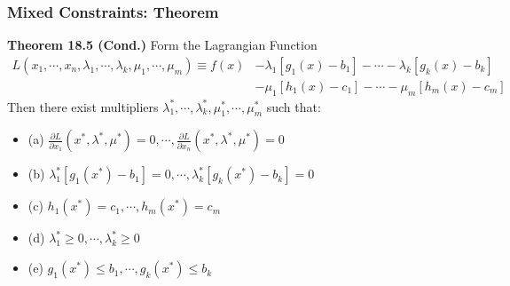 \documentclass[9pt,aspectratio=169]{beamer}
\begin{document}
\begin{frame}
	\frametitle{Mixed Constraints: Theorem}
    \begin{block}{\textbf{Theorem 18.5 (Cond.)}}
        Form the Lagrangian Function \small
        \begin{align} 
            L(x_1,\cdots,x_n,\lambda_1,\cdots,\lambda_k,\mu_1,\cdots,\mu_m)
            \equiv f(x)&-\lambda_1[g_1(x)-b_1]-\cdots - \lambda_k[g_k(x)-b_k] \nonumber \\
            & -\mu_1[h_1(x)-c_1]-\cdots - \mu_m[h_m(x)-c_m]
            \nonumber
        \end{align} 
        Then there exist multipliers $\lambda_1^*,\cdots,
        \lambda_k^*,\mu_1^*,\cdots,\mu_m^*$ such that:
        \begin{itemize}
            \item (a) $\frac{\partial L}{\partial x_1}(x^*,\lambda^*,\mu^*) = 0,\cdots, \frac{\partial L}{\partial x_n}(x^*,\lambda^*,\mu^*) = 0$
            \item (b) $\lambda_1^*[g_1(x^*)-b_1] = 0,\cdots, \lambda_k^*[g_k(x^*)-b_k] = 0$ 
            \item (c) $h_1(x^*) = c_1,\cdots,h_m(x^*) = c_m$ 
            \item (d) $\lambda_1^* \geq 0,\cdots, \lambda_k^* \geq 0$ 
            \item (e) $g_1(x^*) \leq b_1,\cdots, g_k(x^*) \leq b_k$
        \end{itemize}
    \end{block}
\end{frame}	


%
\end{document}
